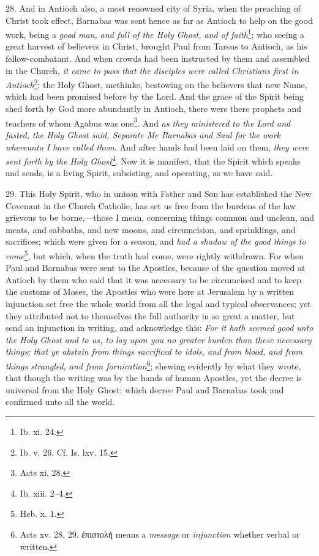 28. And in Antioch also, a most renowned city of Syria, when the preaching of Christ took effect, Barnabas was sent hence as far as Antioch to help on the good work, being a \emph{good man, and full of the Holy Ghost, and of faith}\footnote{Ib. xi. 24.}; who seeing a great harvest of believers in Christ, brought Paul from Tarsus to Antioch, as his fellow-combatant. And when crowds had been instructed by them and assembled in the Church, \emph{it came to pass that the disciples were called Christians first in Antioch}\footnote{Ib. v. 26. Cf. Is. lxv. 15.}; the Holy Ghost, methinks, bestowing on the believers that new Name, which had been promised before by the Lord. And the grace of the Spirit being shed forth by God more abundantly in Antioch, there were there prophets and teachers of whom Agabus was one\footnote{Acts xi. 28.}. And \emph{as they ministered to the Lord and fasted, the Holy Ghost said, Separate Me Barnabas and Saul for the work whereunto I have called them}. And after hands had been laid on them, \emph{they were sent forth by the Holy Ghost}\footnote{Ib. xiii. 2–4.}. Now it is manifest, that the Spirit which speaks and sends, is a living Spirit, subsisting, and operating, as we have said.

29. This Holy Spirit, who in unison with Father and Son has established the New Covenant in the Church Catholic, has set us free from the burdens of the law grievous to be borne,—those I mean, concerning things common and unclean, and meats, and sabbaths, and new moons, and circumcision, and sprinklings, and sacrifices; which were given for a season, and \emph{had a shadow of the good things to come}\footnote{Heb. x. 1.}, but which, when the truth had come, were rightly withdrawn. For when Paul and Barnabas were sent to the Apostles, because of the question moved at Antioch by them who said that it was necessary to be circumcised and to keep the customs of Moses, the Apostles who were here at Jerusalem by a written injunction set free the whole world from all the legal and typical observances; yet they attributed not to themselves the full authority in so great a matter, but send an injunction in writing, and acknowledge this: \emph{For it hath seemed good unto the Holy Ghost and to us, to lay upon you no greater burden than these necessary things; that ye abstain from things sacrificed to idols, and from blood, and from things strangled, and from fornication}\footnote{Acts xv. 28, 29. \textgreek{ἐπιστολή} means a \emph{message} or \emph{injunction} whether verbal or written.}; shewing evidently by what they wrote, that though the writing was by the hands of human Apostles, yet the decree is universal from the Holy Ghost: which decree Paul and Barnabas took and confirmed unto all the world.

